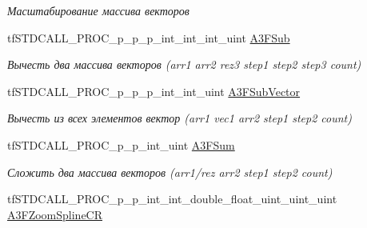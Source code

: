 \begin{DoxyCompactItemize}
\begin{DoxyCompactList}\small\item\em Масштабирование массива векторов \end{DoxyCompactList}\item 
\hypertarget{structs_functions_array_vector_c_p_u_a57604ba537f9cd2330fff816a11b1219}{tf\-S\-T\-D\-C\-A\-L\-L\-\_\-\-P\-R\-O\-C\-\_\-p\-\_\-p\-\_\-p\-\_\-int\-\_\-int\-\_\-int\-\_\-uint \hyperlink{structs_functions_array_vector_c_p_u_a57604ba537f9cd2330fff816a11b1219}{A3\-F\-Sub}}\label{structs_functions_array_vector_c_p_u_a57604ba537f9cd2330fff816a11b1219}

\begin{DoxyCompactList}\small\item\em Вычесть два массива векторов (arr1 arr2 rez3 step1 step2 step3 count) \end{DoxyCompactList}\item 
\hypertarget{structs_functions_array_vector_c_p_u_a1131bcbf83016e4de162964508634173}{tf\-S\-T\-D\-C\-A\-L\-L\-\_\-\-P\-R\-O\-C\-\_\-p\-\_\-p\-\_\-p\-\_\-int\-\_\-int\-\_\-uint \hyperlink{structs_functions_array_vector_c_p_u_a1131bcbf83016e4de162964508634173}{A3\-F\-Sub\-Vector}}\label{structs_functions_array_vector_c_p_u_a1131bcbf83016e4de162964508634173}

\begin{DoxyCompactList}\small\item\em Вычесть из всех элементов вектор (arr1 vec1 arr2 step1 step2 count) \end{DoxyCompactList}\item 
\hypertarget{structs_functions_array_vector_c_p_u_a1a7a704c14f2f3e351be21c0859a3c3f}{tf\-S\-T\-D\-C\-A\-L\-L\-\_\-\-P\-R\-O\-C\-\_\-p\-\_\-p\-\_\-int\-\_\-uint \hyperlink{structs_functions_array_vector_c_p_u_a1a7a704c14f2f3e351be21c0859a3c3f}{A3\-F\-Sum}}\label{structs_functions_array_vector_c_p_u_a1a7a704c14f2f3e351be21c0859a3c3f}

\begin{DoxyCompactList}\small\item\em Сложить два массива векторов (arr1/rez arr2 step1 step2 count) \end{DoxyCompactList}\item 
\hypertarget{structs_functions_array_vector_c_p_u_af29216030728b3ca871759d871d982e9}{tf\-S\-T\-D\-C\-A\-L\-L\-\_\-\-P\-R\-O\-C\-\_\-p\-\_\-p\-\_\-int\-\_\-int\-\_\-double\-\_\-float\-\_\-uint\-\_\-uint\-\_\-uint \hyperlink{structs_functions_array_vector_c_p_u_af29216030728b3ca871759d871d982e9}{A3\-F\-Zoom\-Spline\-C\-R}}\label{structs_functions_array_vector_c_p_u_af29216030728b3ca871759d871d982e9}


\end{DoxyCompactItemize}

